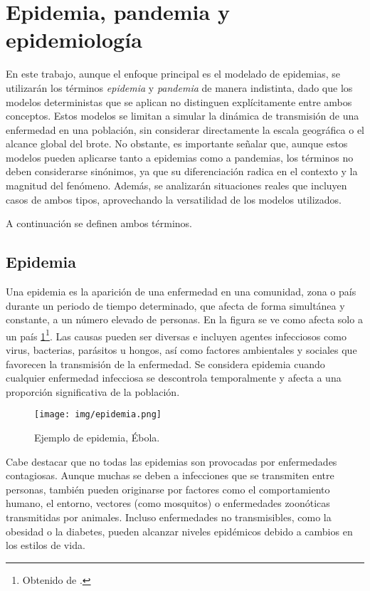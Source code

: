 \setcounter{secnumdepth}{3}

\section{Epidemia, pandemia y epidemiología}
En este trabajo, aunque el enfoque principal es el modelado de epidemias, se utilizarán los términos \textit{epidemia} y \textit{pandemia} de manera indistinta, dado que los modelos deterministas que se aplican no distinguen explícitamente entre ambos conceptos. Estos modelos se limitan a simular la dinámica de transmisión de una enfermedad en una población, sin considerar directamente la escala geográfica o el alcance global del brote.
No obstante, es importante señalar que, aunque estos modelos  pueden aplicarse tanto a epidemias como a pandemias, los términos no deben considerarse sinónimos, ya que su diferenciación radica en el contexto y la magnitud del fenómeno. Además, se analizarán situaciones reales que incluyen casos de ambos tipos, aprovechando la versatilidad de los modelos utilizados.

A continuación se definen ambos términos.

\subsection{Epidemia}
Una epidemia es la aparición de una enfermedad en una comunidad, zona o país durante un periodo de tiempo determinado, que afecta de forma simultánea y constante, a un número elevado de personas. En la figura se ve como afecta solo a un país  \ref{fig:epidemia}\footnote{Obtenido de \cite{bbc_ebola_2014}.}. Las causas pueden ser diversas e incluyen agentes infecciosos como virus, bacterias, parásitos u hongos, así como factores ambientales y sociales que favorecen la transmisión de la enfermedad. Se considera epidemia cuando cualquier enfermedad infecciosa se descontrola temporalmente y afecta a una proporción significativa de la población.

\begin{figure}[H]
    \centering
    \texttt{[image: img/epidemia.png]}
    \caption{Ejemplo de epidemia, Ébola.}
    \label{fig:epidemia}
\end{figure}


Cabe destacar que no todas las epidemias son provocadas por enfermedades contagiosas. Aunque muchas se deben a infecciones que se transmiten entre personas, también pueden originarse por factores como el comportamiento humano, el entorno, vectores (como mosquitos) o enfermedades zoonóticas transmitidas por animales. Incluso enfermedades no transmisibles, como la obesidad o la diabetes, pueden alcanzar niveles epidémicos debido a cambios en los estilos de vida.


